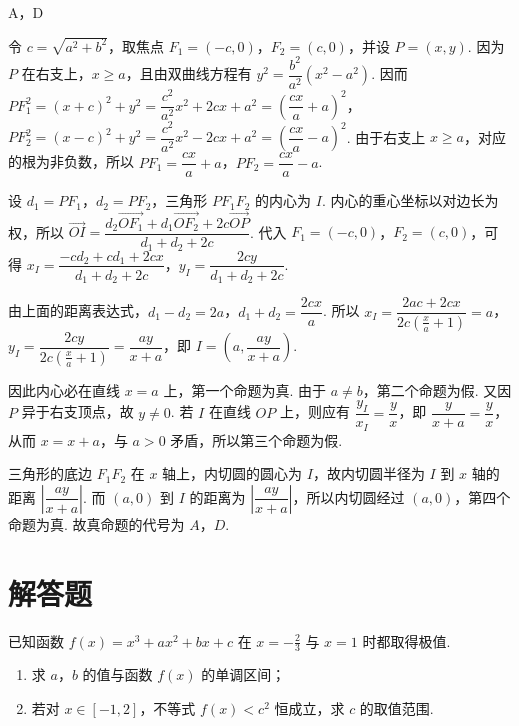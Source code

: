 \begin{answer}
A，D
\end{answer}

\begin{solution}
令 \(c=\sqrt{a^2+b^2}\)，取焦点 \(F_1=(-c,0)\)，\(F_2=(c,0)\)，并设 \(P=(x,y)\). 因为 \(P\) 在右支上，\(x\geqslant a\)，且由双曲线方程有 \(y^2=\dfrac{b^2}{a^2}(x^2-a^2)\). 因而
\(PF_1^2=(x+c)^2+y^2=\dfrac{c^2}{a^2}x^2+2cx+a^2=\left(\dfrac{cx}{a}+a\right)^2\)，
\(PF_2^2=(x-c)^2+y^2=\dfrac{c^2}{a^2}x^2-2cx+a^2=\left(\dfrac{cx}{a}-a\right)^2\).
由于右支上 \(x\geqslant a\)，对应的根为非负数，所以 \(PF_1=\dfrac{cx}{a}+a\)，\(PF_2=\dfrac{cx}{a}-a\).

设 \(d_1=PF_1\)，\(d_2=PF_2\)，三角形 \(PF_1F_2\) 的内心为 \(I\). 内心的重心坐标以对边长为权，所以
\(\overrightarrow{OI}=\dfrac{d_2\overrightarrow{OF_1}+d_1\overrightarrow{OF_2}+2c\overrightarrow{OP}}{d_1+d_2+2c}\). 代入 \(F_1=(-c,0)\)，\(F_2=(c,0)\)，可得
\(x_I=\dfrac{-cd_2+cd_1+2cx}{d_1+d_2+2c}\)，\(y_I=\dfrac{2cy}{d_1+d_2+2c}\).

由上面的距离表达式，\(d_1-d_2=2a\)，\(d_1+d_2=\dfrac{2cx}{a}\). 所以
\(x_I=\dfrac{2ac+2cx}{2c(\frac{x}{a}+1)}=a\)，\(y_I=\dfrac{2cy}{2c(\frac{x}{a}+1)}=\dfrac{ay}{x+a}\)，即 \(I=\left(a,\dfrac{ay}{x+a}\right)\).

因此内心必在直线 \(x=a\) 上，第一个命题为真. 由于 \(a\ne b\)，第二个命题为假. 又因 \(P\) 异于右支顶点，故 \(y\ne0\). 若 \(I\) 在直线 \(OP\) 上，则应有 \(\dfrac{y_I}{x_I}=\dfrac{y}{x}\)，即 \(\dfrac{y}{x+a}=\dfrac{y}{x}\)，从而 \(x=x+a\)，与 \(a>0\) 矛盾，所以第三个命题为假.

三角形的底边 \(F_1F_2\) 在 \(x\) 轴上，内切圆的圆心为 \(I\)，故内切圆半径为 \(I\) 到 \(x\) 轴的距离 \(\left|\dfrac{ay}{x+a}\right|\). 而 \((a,0)\) 到 \(I\) 的距离为 \(\left|\dfrac{ay}{x+a}\right|\)，所以内切圆经过 \((a,0)\)，第四个命题为真. 故真命题的代号为 \(A\)，\(D\).
\end{solution}

\section{解答题}
\begin{problem}
已知函数 \( f(x) = x^3 + ax^2 + bx + c \) 在 \( x = -\frac{2}{3} \) 与 \( x = 1 \) 时都取得极值.
\begin{enumerate}
\item 求 \(a\)，\(b\) 的值与函数 \( f(x) \) 的单调区间；
\item 若对 \(x \in [-1, 2]\)，不等式 \(f(x) < c^2\) 恒成立，求 \(c\) 的取值范围.
\end{enumerate}
\end{problem}

